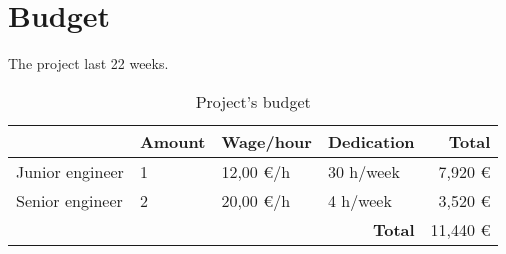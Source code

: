 \chapter{Budget}

\blindtext

The project last 22 weeks.

\begin{table}[h]
\centering
\begin{tabular}{|l|l|l|l|r|} 
\hline
 & \textbf{Amount} & \textbf{Wage/hour} & \textbf{Dedication} & \textbf{Total}  \\ [0.5ex]
\hline
Junior engineer & 1  & 12,00 \euro /h & 30 h/week & 7,920 \euro \\
\hline
Senior engineer & 2 & 20,00 \euro /h  & 4 h/week & 3,520 \euro \\
\hline
 \multicolumn{4}{|r|}{\textbf{Total}} & 11,440 \euro \\
\hline
\end{tabular}
\caption{Project's budget}
\end{table}